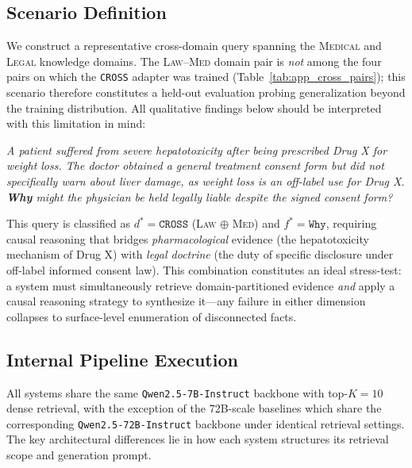 \documentclass[a4paper,fleql]{cas-sc}
\begin{document}
\subsection{Scenario Definition}
\label{ssec:scenario}
We construct a representative cross-domain query spanning the \textsc{Medical}
and \textsc{Legal} knowledge domains. The \textsc{Law}--\textsc{Med} domain
pair is \emph{not} among the four pairs on which the \texttt{CROSS} adapter
was trained (Table~\ref{tab:app_cross_pairs}); this scenario therefore
constitutes a held-out evaluation probing generalization beyond the training
distribution. All qualitative findings below should be interpreted with this
limitation in mind:
\vspace{4pt}
\begin{tcolorbox}[colback=gray!8, colframe=gray!40, arc=2pt,
  boxrule=0.5pt, left=6pt, right=6pt, top=4pt, bottom=4pt]
\small\itshape
A patient suffered from severe hepatotoxicity after being prescribed Drug X
for weight loss. The doctor obtained a general treatment consent form but did
not specifically warn about liver damage, as weight loss is an off-label use
for Drug X. \textbf{Why} might the physician be held legally liable despite
the signed consent form?
\end{tcolorbox}
\vspace{4pt}
\noindent
This query is classified as $d^* = \texttt{CROSS}$ (\textsc{Law} $\oplus$
\textsc{Med}) and $f^* = \texttt{Why}$, requiring causal reasoning that bridges
\textit{pharmacological} evidence (the hepatotoxicity mechanism of Drug X) with
\textit{legal doctrine} (the duty of specific disclosure under off-label
informed consent law). This combination constitutes an ideal stress-test: a
system must simultaneously retrieve domain-partitioned evidence \emph{and}
apply a causal reasoning strategy to synthesize it---any failure in either
dimension collapses to surface-level enumeration of disconnected facts.

\subsection{Internal Pipeline Execution}
\label{ssec:pipeline}
All systems share the same \texttt{Qwen2.5-7B-Instruct} backbone with
top-$K{=}10$ dense retrieval, with the exception of the 72B-scale baselines
which share the corresponding \texttt{Qwen2.5-72B-Instruct} backbone under
identical retrieval settings. The key architectural differences lie in how
each system structures its retrieval scope and generation prompt.
\end{document}
